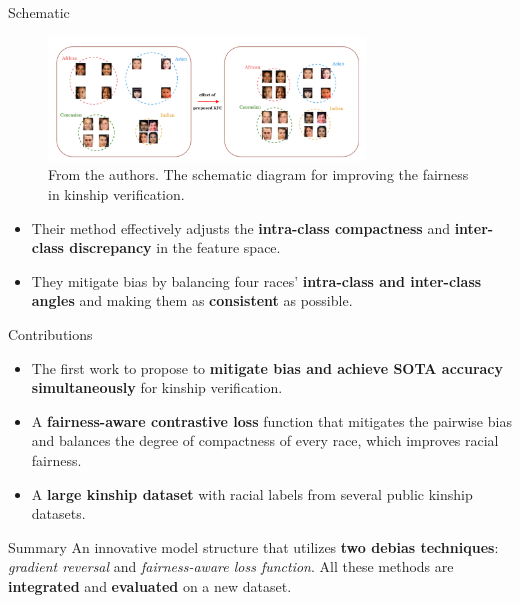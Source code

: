 \documentclass[aspectratio=169,xcolor=dvipsnames]{beamer}
\begin{document}
\begin{frame}{Schematic}
    \begin{figure}
        \centering
        \includegraphics[width=0.75\textwidth]{imgs/1.png}
        \caption{From the authors. The schematic diagram for improving the fairness in kinship verification.}
        \label{fig:kfc-schematic}
    \end{figure}
    \begin{itemize}
        \item Their method effectively adjusts the \textbf{intra-class compactness} and \textbf{inter-class discrepancy} in the feature space.
        \item They mitigate bias by balancing four races' \textbf{intra-class and inter-class angles} and making them as \textbf{consistent} as possible.
    \end{itemize}
\end{frame}


\begin{frame}{Contributions}
    \begin{itemize}
        \item The first work to propose to \textbf{mitigate bias and achieve SOTA accuracy simultaneously} for kinship verification.
        \item A \textbf{fairness-aware contrastive loss} function that mitigates the pairwise bias and balances the degree of compactness of every race, which improves racial fairness.
        \item A \textbf{large kinship dataset} with racial labels from several public kinship datasets.
    \end{itemize}
    \begin{block}{Summary}
        An innovative model structure that utilizes \textbf{two debias techniques}: \textit{gradient reversal} and \textit{fairness-aware loss function}. All these methods are \textbf{integrated} and \textbf{evaluated} on a new dataset.
    \end{block}
\end{frame}
\end{document}
